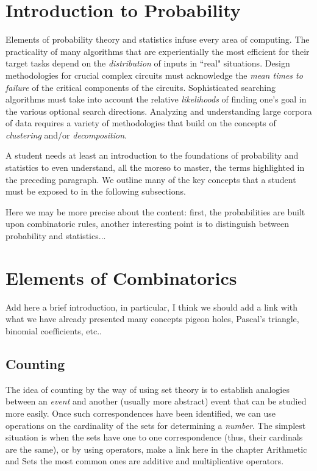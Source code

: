 \section{Introduction to Probability}
\label{sec:prob-stat}


Elements of probability theory and statistics infuse every area of
computing.  The practicality of many algorithms that are
experientially the most efficient for their target tasks depend on the
{\em distribution} of inputs in ``real" situations.  Design
methodologies for crucial complex circuits must acknowledge the {\em
  mean times to failure} of the critical components of the circuits.
Sophisticated searching algorithms must take into account the relative
{\em likelihoods} of finding one's goal in the various optional search
directions.  Analyzing and understanding large corpora of data
requires a variety of methodologies that build on the concepts of {\em
  clustering} and/or {\em decomposition}.

A student needs at least an introduction to the foundations of
probability and statistics to even understand, all the moreso to
master, the terms highlighted in the preceding paragraph.  We outline
many of the key concepts that a student must be exposed to in the
following subsections.

{\Denis Here we may be more precise about the content:  first, the probabilities are built upon combinatoric rules, another interesting point is to distinguish between probability and statistics...}


\section{Elements of Combinatorics}

Add here a brief introduction,
in particular, I think we should add a link with what we have already presented many concepts pigeon holes, 
Pascal's triangle, binomial coefficients, etc..


\subsection{Counting}

The idea of counting by the way of using set theory is to establish analogies between an \textit{event}
and another (usually more abstract) event that can be studied more easily. 
Once such correspondences have been identified, we can use operations on the cardinality of the sets
for determining a \textit{number}.
The simplest situation is when the sets have one to one correspondence (thus, their cardinals are the same), or
by using operators,
{\Denis  make a link here in the chapter Arithmetic and Sets}
the most common ones are additive and multiplicative operators.

